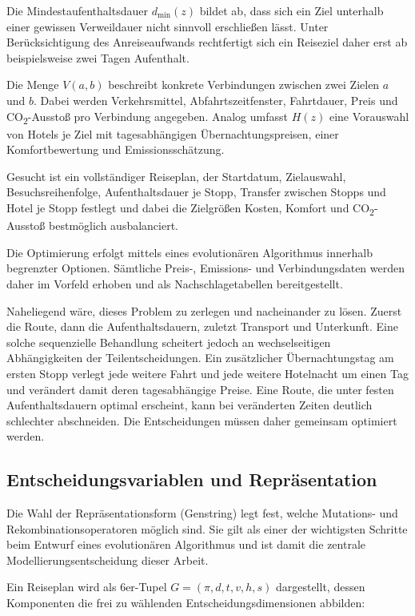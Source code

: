 Die Mindestaufenthaltsdauer $d_{\min}(z)$ bildet ab, dass sich ein Ziel unterhalb einer gewissen Verweildauer nicht sinnvoll erschließen lässt. Unter Berücksichtigung des Anreiseaufwands rechtfertigt sich ein Reiseziel daher erst ab beispielsweise zwei Tagen Aufenthalt.

Die Menge $V(a,b)$ beschreibt konkrete Verbindungen zwischen zwei Zielen $a$ und $b$. Dabei werden Verkehrsmittel, Abfahrtszeitfenster, Fahrtdauer, Preis und CO\textsubscript{2}-Ausstoß pro Verbindung angegeben. Analog umfasst $H(z)$ eine Vorauswahl von Hotels je Ziel mit tagesabhängigen Übernachtungspreisen, einer Komfortbewertung und Emissionsschätzung.

Gesucht ist ein vollständiger Reiseplan, der Startdatum, Zielauswahl, Besuchsreihenfolge, Aufenthaltsdauer je Stopp, Transfer zwischen Stopps und Hotel je Stopp festlegt und dabei die Zielgrößen Kosten, Komfort und CO\textsubscript{2}-Ausstoß bestmöglich ausbalanciert.

Die Optimierung erfolgt mittels eines evolutionären Algorithmus innerhalb begrenzter Optionen. Sämtliche Preis-, Emissions- und Verbindungsdaten werden daher im Vorfeld erhoben und als Nachschlagetabellen bereitgestellt.

Naheliegend wäre, dieses Problem zu zerlegen und nacheinander zu lösen. Zuerst die Route, dann die Aufenthaltsdauern, zuletzt Transport und Unterkunft. Eine solche sequenzielle Behandlung scheitert jedoch an wechselseitigen Abhängigkeiten der Teilentscheidungen. Ein zusätzlicher Übernachtungstag am ersten Stopp verlegt jede weitere Fahrt und jede weitere Hotelnacht um einen Tag und verändert damit deren tagesabhängige Preise. Eine Route, die unter festen Aufenthaltsdauern optimal erscheint, kann bei veränderten Zeiten deutlich schlechter abschneiden. Die Entscheidungen müssen daher gemeinsam optimiert werden.

\subsection{Entscheidungsvariablen und Repräsentation}
\label{subsec:repraesentation}

Die Wahl der Repräsentationsform (Genstring) legt fest, welche Mutations- und Rekombinationsoperatoren möglich sind. Sie gilt als einer der wichtigsten Schritte beim Entwurf eines evolutionären Algorithmus \cite[49]{eibenSmithIntroductionEvolutionary2015} und ist damit die zentrale Modellierungsentscheidung dieser Arbeit.

Ein Reiseplan wird als 6er-Tupel $G = (\pi, d, t, v, h, s)$ dargestellt, dessen Komponenten die frei zu wählenden Entscheidungsdimensionen abbilden:


